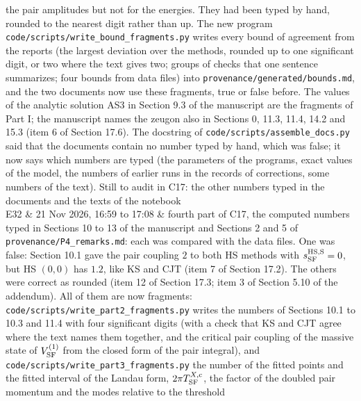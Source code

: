 \documentclass[
  10pt,
]{article}
\begin{document}
\begin{longtable}[]
the pair amplitudes but not for the energies. They had been typed by
hand, rounded to the nearest digit rather than up. The new program
\texttt{code/scripts/write\_bound\_fragments.py} writes every bound of
agreement from the reports (the largest deviation over the methods,
rounded up to one significant digit, or two where the text gives two;
groups of checks that one sentence summarizes; four bounds from data
files) into \texttt{provenance/generated/bounds.md}, and the two
documents now use these fragments, true or false before. The values of
the analytic solution AS3 in Section 9.3 of the manuscript are the
fragments of Part I; the manuscript names the zeugon also in Sections 0,
11.3, 11.4, 14.2 and 15.3 (item 6 of Section 17.6). The docstring of
\texttt{code/scripts/assemble\_docs.py} said that the documents contain
no number typed by hand, which was false; it now says which numbers are
typed (the parameters of the programs, exact values of the model, the
numbers of earlier runs in the records of corrections, some numbers of
the text). Still to audit in C17: the other numbers typed in the
documents and the texts of the notebook \\
E32 & 21 Nov 2026, 16:59 to 17:08 & fourth part of C17, the computed
numbers typed in Sections 10 to 13 of the manuscript and Sections 2 and
5 of \texttt{provenance/P4\_remarks.md}: each was compared with the data
files. One was false: Section 10.1 gave the pair coupling \(2\) to both
HS methods with \(s^{\rm HS,S}_{\rm SF}=0\), but HS \((0,0)\) has
\(1.2\), like KS and CJT (item 7 of Section 17.2). The others were
correct as rounded (item 12 of Section 17.3; item 3 of Section 5.10 of
the addendum). All of them are now fragments:
\texttt{code/scripts/write\_part2\_fragments.py} writes the numbers of
Sections 10.1 to 10.3 and 11.4 with four significant digits (with a
check that KS and CJT agree where the text names them together, and the
critical pair coupling of the massive state of \(V^{(1)}_{\rm SF}\) from
the closed form of the pair integral), and
\texttt{code/scripts/write\_part3\_fragments.py} the number of the
fitted points and the fitted interval of the Landau form,
\(2\pi T^{X,{\rm c}}_{\rm SF}\), the factor of the doubled pair momentum
and the modes relative to the threshold \\
\end{longtable}
\end{document}
